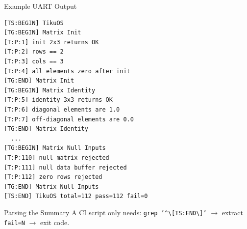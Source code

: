 \documentclass[aspectratio=169, 10pt]{beamer}
\begin{document}
\begin{frame}[fragile]{Example UART Output}
\begin{lstlisting}[style=outputstyle, title={Captured from MSP430FR5969 over UART @ 115200 baud}]
[TS:BEGIN] TikuOS
[TG:BEGIN] Matrix Init
[T:P:1] init 2x3 returns OK
[T:P:2] rows == 2
[T:P:3] cols == 3
[T:P:4] all elements zero after init
[TG:END] Matrix Init
[TG:BEGIN] Matrix Identity
[T:P:5] identity 3x3 returns OK
[T:P:6] diagonal elements are 1.0
[T:P:7] off-diagonal elements are 0.0
[TG:END] Matrix Identity
  ...
[TG:BEGIN] Matrix Null Inputs
[T:P:110] null matrix rejected
[T:P:111] null data buffer rejected
[T:P:112] zero rows rejected
[TG:END] Matrix Null Inputs
[TS:END] TikuOS total=112 pass=112 fail=0
\end{lstlisting}

\vspace{0.3em}
\begin{block}{Parsing the Summary}
A CI script only needs: \texttt{grep '\textasciicircum\textbackslash[TS:END\textbackslash]'} $\rightarrow$ extract \texttt{fail=N} $\rightarrow$ exit code.
\end{block}
\end{frame}
\end{document}
